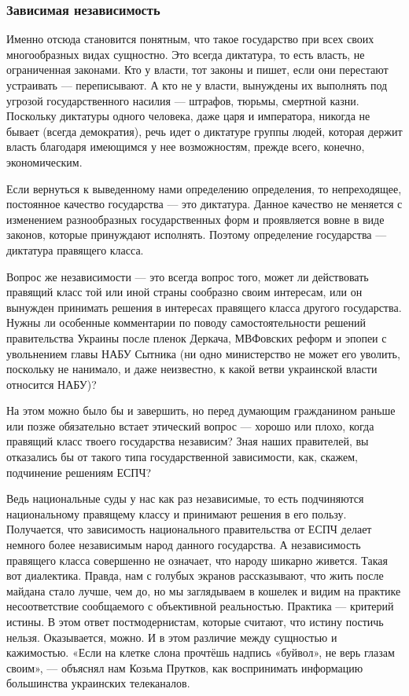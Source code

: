 \subsubsection{Зависимая независимость}

Именно отсюда становится понятным, что такое государство при всех своих
многообразных видах сущностно. Это всегда диктатура, то есть власть, не
ограниченная законами. Кто у власти, тот законы и пишет, если они перестают
устраивать — переписывают. А кто не у власти, вынуждены их выполнять под
угрозой государственного насилия — штрафов, тюрьмы, смертной казни. Поскольку
диктатуры одного человека, даже царя и императора, никогда не бывает (всегда
демократия), речь идет о диктатуре группы людей, которая держит власть
благодаря имеющимся у нее возможностям, прежде всего, конечно, экономическим.

Если вернуться к выведенному нами определению определения, то непреходящее,
постоянное качество государства — это диктатура. Данное качество не меняется с
изменением разнообразных государственных форм и проявляется вовне в виде
законов, которые принуждают исполнять. Поэтому определение государства —
диктатура правящего класса.

Вопрос же независимости — это всегда вопрос того, может ли действовать правящий
класс той или иной страны сообразно своим интересам, или он вынужден принимать
решения в интересах правящего класса другого государства. Нужны ли особенные
комментарии по поводу самостоятельности решений правительства Украины после
пленок Деркача, МВФовских реформ и эпопеи с увольнением главы НАБУ Сытника (ни
одно министерство не может его уволить, поскольку не нанимало, и даже
неизвестно, к какой ветви украинской власти относится НАБУ)?

На этом можно было бы и завершить, но перед думающим гражданином раньше или
позже обязательно встает этический вопрос — хорошо или плохо, когда правящий
класс твоего государства независим? Зная наших правителей, вы отказались бы от
такого типа государственной зависимости, как, скажем, подчинение решениям ЕСПЧ?

Ведь национальные суды у нас как раз независимые, то есть подчиняются
национальному правящему классу и принимают решения в его пользу. Получается,
что зависимость национального правительства от ЕСПЧ делает немного более
независимым народ данного государства. А независимость правящего класса
совершенно не означает, что народу шикарно живется. Такая вот диалектика.
Правда, нам с голубых экранов рассказывают, что жить после майдана стало лучше,
чем до, но мы заглядываем в кошелек и видим на практике несоответствие
сообщаемого с объективной реальностью. Практика — критерий истины. В этом ответ
постмодернистам, которые считают, что истину постичь нельзя. Оказывается,
можно. И в этом различие между сущностью и кажимостью. «Если на клетке слона
прочтёшь надпись «буйвол», не верь глазам своим», — объяснял нам Козьма
Прутков, как воспринимать информацию большинства украинских телеканалов.

